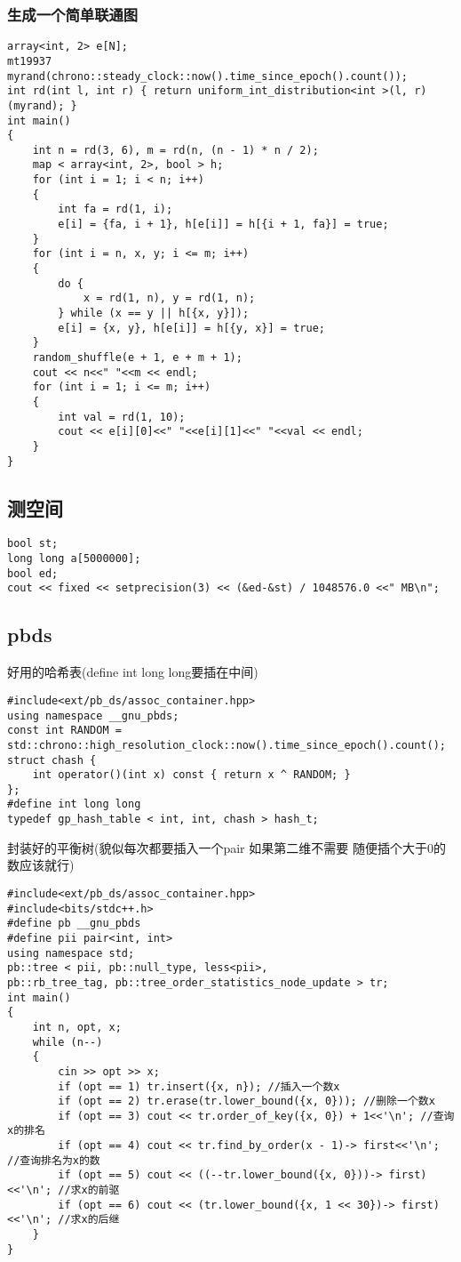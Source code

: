 \documentclass[a4paper, fontset=none]{ctexart}
\begin{document}
\subsubsection{生成一个简单联通图}

\begin{verbatim}
array<int, 2> e[N];
mt19937 myrand(chrono::steady_clock::now().time_since_epoch().count());
int rd(int l, int r) { return uniform_int_distribution<int >(l, r)(myrand); }
int main()
{
    int n = rd(3, 6), m = rd(n, (n - 1) * n / 2);
    map < array<int, 2>, bool > h;
    for (int i = 1; i < n; i++)
    {
        int fa = rd(1, i);
        e[i] = {fa, i + 1}, h[e[i]] = h[{i + 1, fa}] = true;
    }
    for (int i = n, x, y; i <= m; i++)
    {
        do {
            x = rd(1, n), y = rd(1, n);
        } while (x == y || h[{x, y}]);
        e[i] = {x, y}, h[e[i]] = h[{y, x}] = true;
    }
    random_shuffle(e + 1, e + m + 1);
    cout << n<<" "<<m << endl;
    for (int i = 1; i <= m; i++)
    {
        int val = rd(1, 10);
        cout << e[i][0]<<" "<<e[i][1]<<" "<<val << endl;
    }
}
\end{verbatim}
\subsection{测空间}

\begin{verbatim}
bool st;
long long a[5000000];
bool ed;
cout << fixed << setprecision(3) << (&ed-&st) / 1048576.0 <<" MB\n";
\end{verbatim}
\subsection{pbds}
好用的哈希表(define int long long要插在中间)
\begin{verbatim}
#include<ext/pb_ds/assoc_container.hpp>
using namespace __gnu_pbds;
const int RANDOM = std::chrono::high_resolution_clock::now().time_since_epoch().count();
struct chash {
    int operator()(int x) const { return x ^ RANDOM; }
};
#define int long long
typedef gp_hash_table < int, int, chash > hash_t;
\end{verbatim}

封装好的平衡树(貌似每次都要插入一个pair 如果第二维不需要 随便插个大于0的数应该就行)

\begin{verbatim}
#include<ext/pb_ds/assoc_container.hpp>
#include<bits/stdc++.h>
#define pb __gnu_pbds
#define pii pair<int, int>
using namespace std;
pb::tree < pii, pb::null_type, less<pii>,
pb::rb_tree_tag, pb::tree_order_statistics_node_update > tr;
int main()
{
    int n, opt, x;
    while (n--)
    {
        cin >> opt >> x;
        if (opt == 1) tr.insert({x, n}); //插入一个数x
        if (opt == 2) tr.erase(tr.lower_bound({x, 0})); //删除一个数x
        if (opt == 3) cout << tr.order_of_key({x, 0}) + 1<<'\n'; //查询x的排名
        if (opt == 4) cout << tr.find_by_order(x - 1)-> first<<'\n'; //查询排名为x的数
        if (opt == 5) cout << ((--tr.lower_bound({x, 0}))-> first)<<'\n'; //求x的前驱
        if (opt == 6) cout << (tr.lower_bound({x, 1 << 30})-> first)<<'\n'; //求x的后继
    }
}
\end{verbatim}
\end{document}
